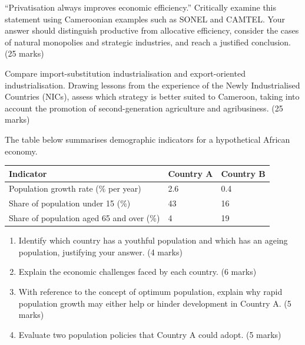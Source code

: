 \documentclass[11pt]{article}
\begin{document}
\begin{exercice}
``Privatisation always improves economic efficiency.'' Critically examine this statement using Cameroonian examples such as SONEL and CAMTEL. Your answer should distinguish productive from allocative efficiency, consider the cases of natural monopolies and strategic industries, and reach a justified conclusion. \hfill (25 marks)
\end{exercice}

\begin{exercice}
Compare import-substitution industrialisation and export-oriented industrialisation. Drawing lessons from the experience of the Newly Industrialised Countries (NICs), assess which strategy is better suited to Cameroon, taking into account the promotion of second-generation agriculture and agribusiness. \hfill (25 marks)
\end{exercice}

\begin{exercice}
The table below summarises demographic indicators for a hypothetical African economy.
\begin{center}
\begin{tabularx}{\linewidth}{|l|X|X|}
\hline
\rowcolor{popblueL} Indicator & Country A & Country B \\
\hline Population growth rate (\% per year) & 2.6 & 0.4 \\
\hline Share of population under 15 (\%) & 43 & 16 \\
\hline Share of population aged 65 and over (\%) & 4 & 19 \\
\hline
\end{tabularx}
\end{center}
\begin{enumerate}
\item Identify which country has a youthful population and which has an ageing population, justifying your answer. \hfill (4 marks)
\item Explain the economic challenges faced by each country. \hfill (6 marks)
\item With reference to the concept of optimum population, explain why rapid population growth may either help or hinder development in Country A. \hfill (5 marks)
\item Evaluate two population policies that Country A could adopt. \hfill (5 marks)
\end{enumerate}
\end{exercice}
\end{document}

